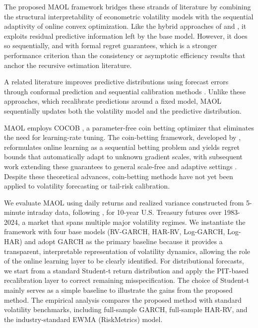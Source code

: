 The proposed MAOL framework bridges these strands of literature by combining the structural interpretability of econometric volatility models with the sequential adaptivity of online convex optimization. Like the hybrid approaches of \citet{ZhuoMorimoto2024} and \citet{TapiaKristjanpoller2022}, it exploits residual predictive information left by the base model. However, it does so sequentially, and with formal regret guarantees, which is a stronger performance criterion than the consistency or asymptotic efficiency results that anchor the recursive estimation literature.

A related literature improves predictive distributions using forecast errors through conformal prediction and sequential calibration methods \citep{FosterVohra1998, kuleshov2018calibrated, Vovk2020, GibbsCandes2021, GibbsCandes2024, Deshpande2024}. Unlike these approaches, which recalibrate predictions around a fixed model, MAOL sequentially updates both the volatility model and the predictive distribution.

MAOL employs COCOB \citep{orabona2017training}, a parameter-free coin betting optimizer that eliminates the need for learning-rate tuning. The coin-betting framework, developed by \citet{orabona2016coin}, reformulates online learning as a sequential betting problem and yields regret bounds that automatically adapt to unknown gradient scales, with subsequent work extending these guarantees to general scale-free and adaptive settings \citep{mcmahan2014unconstrained, cutkosky2018blackbox, orabona2018scalefree, jun2017changing, jun2017improved}. Despite these theoretical advances, coin-betting methods have not yet been applied to volatility forecasting or tail-risk calibration.

We evaluate MAOL using daily returns and realized variance constructed from 5-minute intraday data, following \citet{liu2015does}, for 10-year U.S. Treasury futures over 1983-2024, a market that spans multiple major volatility regimes. We instantiate the framework with four base models (RV-GARCH, HAR-RV, Log-GARCH, Log-HAR) and adopt GARCH as the primary baseline because it provides a transparent, interpretable representation of volatility dynamics, allowing the role of the online learning layer to be clearly identified. For distributional forecasts, we start from a standard Student-t return distribution and apply the PIT-based recalibration layer to correct remaining misspecification. The choice of Student-t mainly serves as a simple baseline to illustrate the gains from the proposed method. The empirical analysis compares the proposed method with standard volatility benchmarks, including full-sample GARCH, full-sample HAR-RV, and the industry-standard EWMA (RiskMetrics) model.


